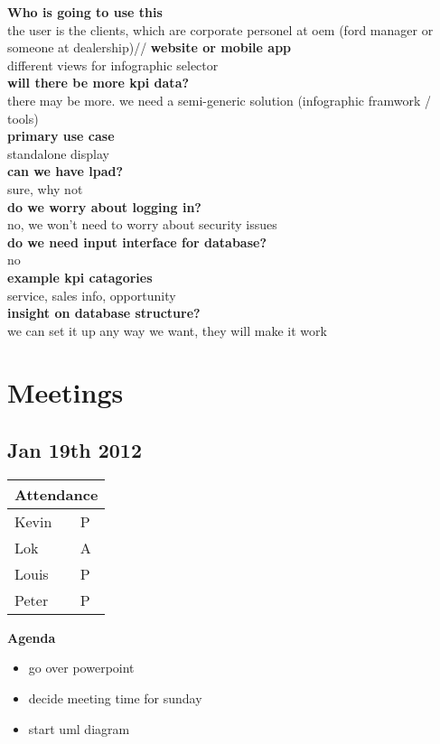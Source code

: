 \documentclass[11pt,a4paper,oneside]{article}
\begin{document}
\textbf{Who is going to use this}\\
the user is the clients, which are corporate personel at oem (ford manager or someone at dealership)//
\textbf{website or mobile app}\\
different views for infographic selector\\
\textbf{will there be more kpi data?}\\
there may be more.  we need a semi-generic solution (infographic framwork / tools)\\
\textbf{primary use case}\\
standalone display\\
\textbf{can we have lpad?}\\
sure, why not\\
\textbf{do we worry about logging in?}\\
no, we won't need to worry about security issues\\
\textbf{do we need input interface for database?}\\
no\\
\textbf{example kpi catagories}\\
service, sales info, opportunity\\
\textbf{insight on database structure?}\\
we can set it up any way we want, they will make it work\\


\section{Meetings}
\subsection{Jan 19th 2012}
\begin{tabular}{ | l | l | }
\hline
\multicolumn{2}{|c|}{Attendance} \\
\hline
Kevin & P\\
Lok   & A\\
Louis & P\\
Peter & P\\
\hline
\end{tabular}

\textbf{Agenda}\\
\begin{itemize}
\item go over powerpoint\\
\item decide meeting time for sunday\\
\item start uml diagram\\
\end{itemize}
\end{document}
